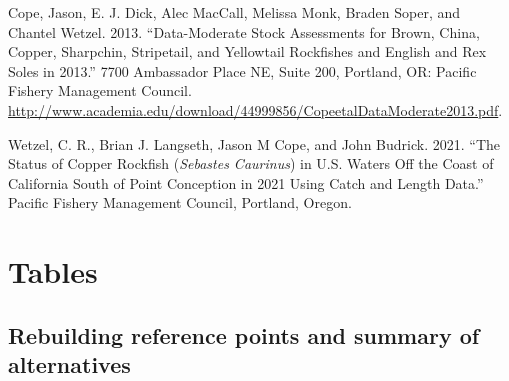 \documentclass[11pt,
  english,
  a4paper,
]{article}
\newlength{\cslhangindent}
\newenvironment{CSLReferences}[2] %
 {%
  \setlength{\parindent}{0pt}
  \ifodd #1 \everypar{\setlength{\hangindent}{\cslhangindent}}\ignorespaces\fi
  \ifnum #2 > 0
  \setlength{\parskip}{#2\baselineskip}
  \fi
 }%
 {}
\begin{document}
\hypertarget{refs}{}
\begin{CSLReferences}{1}{0}
\leavevmode{}%
Cope, Jason, E. J. Dick, Alec MacCall, Melissa Monk, Braden Soper, and Chantel Wetzel. 2013. {``Data-Moderate Stock Assessments for Brown, {China}, Copper, Sharpchin, Stripetail, and Yellowtail Rockfishes and {English} and Rex Soles in 2013.''} 7700 Ambassador Place NE, Suite 200, Portland, OR: Pacific Fishery Management Council. \url{http://www.academia.edu/download/44999856/CopeetalDataModerate2013.pdf}.

\leavevmode{}%
Wetzel, C. R., Brian J. Langseth, Jason M Cope, and John Budrick. 2021. {``The Status of Copper Rockfish (\emph{{Sebastes} Caurinus}) in {U}.{S}. Waters Off the Coast of {California} South of {Point} {Conception} in 2021 Using Catch and Length Data.''} Pacific Fishery Management Council, Portland, Oregon.

\end{CSLReferences}

\leavevmode\tagmcend\tagstructend

\clearpage


\hypertarget{tables}{%
\section{Tables}\label{tables}}

\leavevmode\tagmcend\tagstructend


\hypertarget{rebuilding-reference-points-and-summary-of-alternatives}{%
\subsection{Rebuilding reference points and summary of alternatives}\label{rebuilding-reference-points-and-summary-of-alternatives}}

\leavevmode\tagmcend\tagstructend

\begingroup\fontsize{10}{12}\selectfont
\begingroup\fontsize{10}{12}\selectfont
\end{document}
